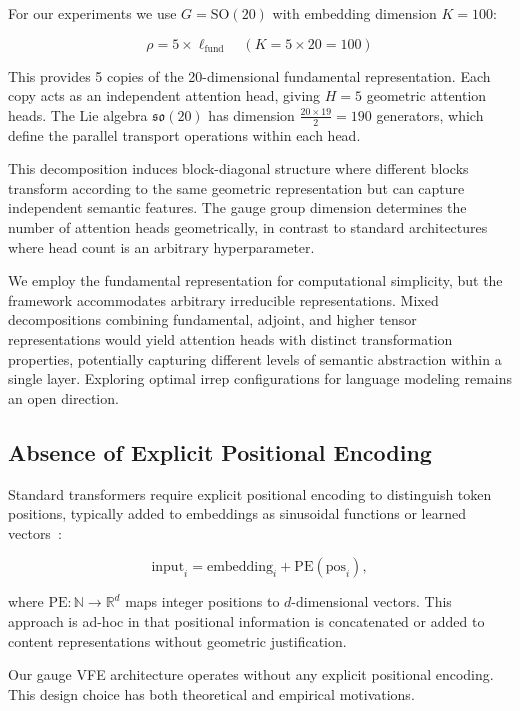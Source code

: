 \documentclass[twoside,11pt]{article}
\begin{document}
For our experiments we use $G = \text{SO}(20)$ with embedding dimension $K = 100$:

\begin{equation}
\rho = 5 \times \ell_{\text{fund}} \quad (K = 5 \times 20 = 100)
\end{equation}

This provides 5 copies of the 20-dimensional fundamental representation. Each copy acts as an independent attention head, giving $H = 5$ geometric attention heads. The Lie algebra $\mathfrak{so}(20)$ has dimension $\frac{20 \times 19}{2} = 190$ generators, which define the parallel transport operations within each head.

This decomposition induces block-diagonal structure where different blocks transform according to the same geometric representation but can capture independent semantic features. The gauge group dimension determines the number of attention heads geometrically, in contrast to standard architectures where head count is an arbitrary hyperparameter.

We employ the fundamental representation for computational simplicity, but the framework accommodates arbitrary irreducible representations. Mixed decompositions combining fundamental, adjoint, and higher tensor representations would yield attention heads with distinct transformation properties, potentially capturing different levels of semantic abstraction within a single layer. Exploring optimal irrep configurations for language modeling remains an open direction.

\subsection{Absence of Explicit Positional Encoding}

Standard transformers require explicit positional encoding to distinguish token positions, typically added to embeddings as sinusoidal functions or learned vectors~\citep{vaswani2017attention}:

\begin{equation}
\text{input}_i = \text{embedding}_i + \text{PE}(\text{pos}_i),
\end{equation}

where $\text{PE}: \mathbb{N} \to \mathbb{R}^d$ maps integer positions to $d$-dimensional vectors. This approach is ad-hoc in that positional information is concatenated or added to content representations without geometric justification.

Our gauge VFE architecture operates without any explicit positional encoding. This design choice has both theoretical and empirical motivations.
\end{document}
